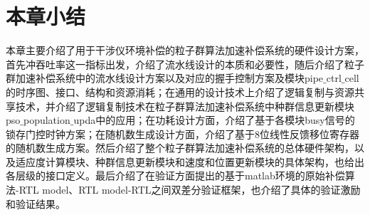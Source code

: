 \section{本章小结}
本章主要介绍了用于干涉仪环境补偿的粒子群算法加速补偿系统的硬件设计方案，首先冲吞吐率这一指标出发，介绍了流水线设计的本质和必要性，随后介绍了粒子群加速补偿系统中的流水线设计方案以及对应的握手控制方案及模块pipe$\_$ctrl$\_$cell的时序图、接口、结构和资源消耗；在通用的设计技术上介绍了逻辑复制与资源共享技术，并介绍了逻辑复制技术在粒子群算法加速补偿系统中种群信息更新模块pso$\_$population$\_$upda中的应用；在功耗设计方面，介绍了基于各模块busy信号的锁存门控时钟方案；在随机数生成设计方面，介绍了基于8位线性反馈移位寄存器的随机数生成方案。然后介绍了整个粒子群算法加速补偿系统的总体硬件架构，以及适应度计算模块、种群信息更新模块和速度和位置更新模块的具体架构，也给出各层级的接口定义。最后介绍了在验证方面提出的基于matlab环境的原始补偿算法-RTL model、RTL model-RTL之间双差分验证框架，也介绍了具体的验证激励和验证结果。
